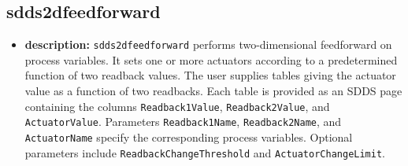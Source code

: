 \begin{latexonly}
\newpage
\end{latexonly}

\subsection{sdds2dfeedforward}
\label{sdds2dfeedforward}

\begin{itemize}
\item {\bf description:}
\verb+sdds2dfeedforward+ performs two-dimensional feedforward on process variables.
It sets one or more actuators according to a predetermined function of two readback
values.  The user supplies tables giving the actuator value as a function of two
readbacks.  Each table is provided as an SDDS page containing the columns
\verb+Readback1Value+, \verb+Readback2Value+, and \verb+ActuatorValue+.  Parameters
\verb+Readback1Name+, \verb+Readback2Name+, and \verb+ActuatorName+ specify the
corresponding process variables.  Optional parameters include
\verb+ReadbackChangeThreshold+ and \verb+ActuatorChangeLimit+.


\end{itemize}
